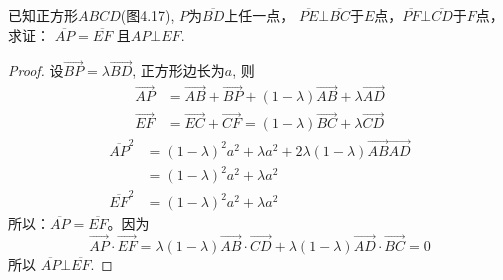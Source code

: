 \begin{example}
    已知正方形$ABCD$(图4.17), $P$为$\overline{BD}$上任一点，
$\overline{PE}\bot \overline{BC}$于$E$点，$\overline{PF}\bot \overline{CD}$于$F$点，求证：
$\overline{AP}=\overline{EF}$
且$AP\bot EF$.
\end{example}

\begin{proof}
设$\Vec{BP}=\lambda \Vec{BD}$, 正方形边长为$a$, 则
\[\begin{split}
    \Vec{AP}&=\Vec{AB}+\Vec{BP}+(1-\lambda)\Vec{AB}+\lambda\Vec{AD}\\
    \Vec{EF}&=\Vec{EC}+\Vec{CF}=(1-\lambda)\Vec{BC}+\lambda\Vec{CD}
\end{split}\]
\[\begin{split}
    \overline{AP}^2&=(1-\lambda )^2 a^2+\lambda a^2+2\lambda(1-\lambda)\Vec{AB}\Vec{AD}\\
&=(1-\lambda )^2 a^2+\lambda a^2\\
\overline{EF}^2&=(1-\lambda )^2 a^2+\lambda a^2
\end{split}\]
所以：$\overline{AP}=\overline{EF}$。因为
\[\Vec{AP}\cdot \Vec{EF}=\lambda (1-\lambda)\Vec{AB}\cdot \Vec{CD}+\lambda(1-\lambda)\Vec{AD}\cdot \Vec{BC}=0\]
所以
$\overline{AP} \bot \overline{EF}$.
\end{proof}

\begin{figure}[htp]\centering
    \begin{minipage}[t]{0.48\textwidth}
    \centering
{}
    \caption{}
    \end{minipage}
    \begin{minipage}[t]{0.48\textwidth}
    \centering
    \caption{}
    \end{minipage}
    \end{figure}

